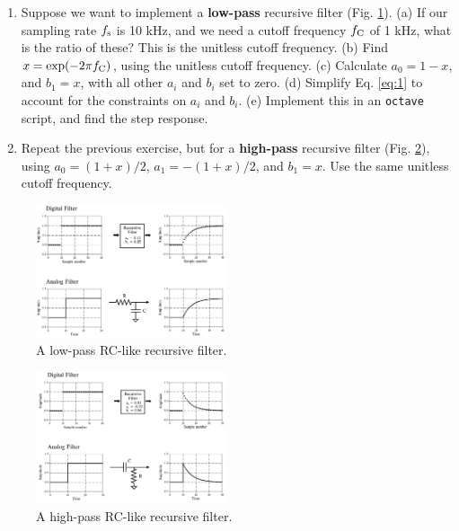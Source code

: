 \documentclass{article}
\begin{document}
\begin{enumerate}
\item Suppose we want to implement a \textbf{low-pass} recursive filter (Fig. \ref{fig:1}).  (a) If our sampling rate $f_{\rm s}$ is 10 kHz, and we need a cutoff frequency $f_{\rm C}$ of 1 kHz, what is the ratio of these?  This is the unitless cutoff frequency. (b) Find $x = \exp(-2\pi f_{\rm C})$, using the unitless cutoff frequency. (c) Calculate $a_0 = 1-x$, and $b_1 = x$, with all other $a_i$ and $b_i$ set to zero. (d) Simplify Eq. \ref{eq:1} to account for the constraints on $a_i$ and $b_i$.  (e) Implement this in an \verb+octave+ script, and find the step response.
\item Repeat the previous exercise, but for a \textbf{high-pass} recursive filter (Fig. \ref{fig:2}), using $a_0 = (1+x)/2$, $a_1 = -(1+x)/2$, and $b_1 = x$. Use the same unitless cutoff frequency.
\end{enumerate}

\begin{figure}[hb]
\centering
\includegraphics[width=0.5\textwidth]{lp_rec.png}
\caption{\label{fig:1} A low-pass RC-like recursive filter.}
\end{figure}
\vspace{1cm}
\begin{figure}[hb]
\centering
\includegraphics[width=0.5\textwidth]{hp_rec.png}
\caption{\label{fig:2} A high-pass RC-like recursive filter.}
\end{figure}
\end{document}
